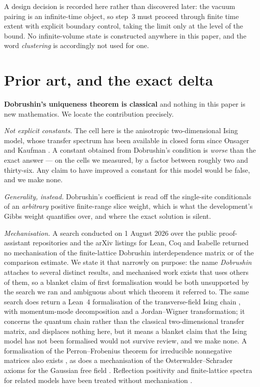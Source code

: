 \documentclass[11pt]{article}
\theoremstyle{definition}
\begin{document}
A design decision is recorded here rather than discovered later: the vacuum
pairing is an infinite-time object, so step~3 must proceed through finite time
extent with explicit boundary control, taking the limit only at the level of the
bound.  No infinite-volume state is constructed anywhere in this paper, and the
word \emph{clustering} is accordingly not used for one.

\section{Prior art, and the exact delta}
\label{sec:prior}

\textbf{Dobrushin's uniqueness theorem is classical}
\cite{Dobrushin1968,Dobrushin1970,Simon1993} and nothing in this paper
is new mathematics.  We locate the contribution precisely.

\emph{Not explicit constants.}  The cell here is the anisotropic
two-dimensional Ising model, whose transfer spectrum has been available in
closed form since Onsager \cite{Onsager1944} and Kaufman \cite{Kaufman1949}.  A constant obtained from Dobrushin's
condition is \emph{worse} than the exact answer --- on the cells we measured, by
a factor between roughly two and thirty-six.  Any claim to have improved a
constant for this model would be false, and we make none.

\emph{Generality, instead.}  Dobrushin's coefficient is read off the single-site
conditionals of an \emph{arbitrary} positive finite-range slice weight, which is
what the development's Gibbs weight quantifies over, and where the exact
solution is silent.

\emph{Mechanisation.}  A search conducted on 1 August 2026 over the public
proof-assistant repositories and the arXiv listings for Lean, Coq and
Isabelle returned no mechanisation of the finite-lattice Dobrushin
interdependence matrix or of the comparison estimate.  We state it that
narrowly on purpose: the name \emph{Dobrushin} attaches to several distinct
results, and mechanised work exists that uses others of them, so a blanket
claim of first formalisation would be both unsupported by the search we ran and
ambiguous about which theorem it referred to.  The
same search does return a Lean~4 formalisation of the transverse-field Ising
chain \cite{LeanIsing2026}, with momentum-mode decomposition and a
Jordan--Wigner transformation; it
concerns the quantum chain rather than the classical two-dimensional transfer
matrix, and displaces nothing here, but it means a blanket claim that the Ising
model has not been formalised would not survive review, and we make none.  A
formalisation of the Perron--Frobenius theorem for irreducible nonnegative
matrices also exists \cite{Mathlib2020}, as does a mechanisation of the
Osterwalder--Schrader axioms for the Gaussian free field \cite{OSforGFF2026}.  Reflection positivity and finite-lattice spectra for
related models have been treated without mechanisation \cite{WashburnSimons2026}.
\end{document}
